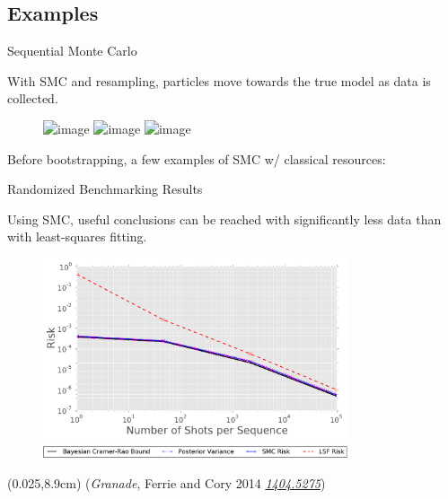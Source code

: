 \documentclass[xcolor=dvipsnames, compress]{beamer}
\renewcommand\UrlFont{\color{red}\rmfamily\itshape}
\newcommand{\arxiv}[1]{\href{https://scirate.com/arxiv/#1}{\UrlFont #1}}
\newcommand{\bottomnote}[1]{
  \begin{textblock*}{0.95\paperwidth} (0.025\paperwidth,8.9cm)
    {\tiny \hfill #1}
  \end{textblock*}
}
\begin{document}
\subsection{Examples}

\begin{frame}{Sequential Monte Carlo}
  
  With SMC and resampling, particles move towards the true model as data is collected.
  
  \begin{figure}
    \includegraphics<1>[width=0.6\textwidth]{figures/1D_SMC_1_v2}
    \includegraphics<2>[width=0.6\textwidth]{figures/1D_SMC_6_v2}
    \includegraphics<3>[width=0.6\textwidth]{figures/1D_SMC_11_v2}
  \end{figure}
  
\end{frame}

\begin{frame}{}

  Before bootstrapping, a few examples of SMC w/ classical resources:

\end{frame}

\begin{frame}{Randomized Benchmarking Results}

  Using SMC, useful conclusions can be reached with significantly
  less data than with least-squares fitting.

  \begin{figure}
    \centering
    \includegraphics[width=0.8\textwidth]{figures/risk-tr-comparison} \\
    \includegraphics[width=0.8\textwidth]{figures/risk-comparison-legend-crop}
  \end{figure}

  \bottomnote{(\emph{Granade}, Ferrie and Cory 2014 \arxiv{1404.5275})}

\end{frame}
\end{document}
